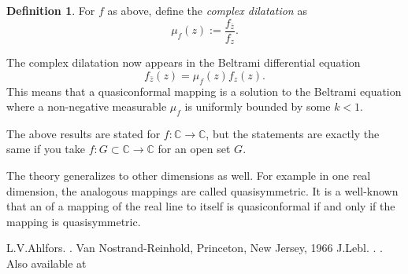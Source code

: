 \documentclass[12pt]{article}
\theoremstyle{theorem}
\theoremstyle{definition}
\newtheorem*{defn}{Definition}
\begin{document}
\begin{defn}
For $f$ as above, define the {\em complex dilatation} as
\begin{equation*}
\mu_f(z) := \frac{f_{\bar{z}}}{f_z} .
\end{equation*}
\end{defn}

The complex dilatation now appears in the Beltrami differential equation
\begin{equation*}
f_{\bar{z}}(z) = \mu_f(z)f_z(z) .
\end{equation*}
This means that a quasiconformal mapping is a solution to the Beltrami equation where a non-negative measurable $\mu_f$ is uniformly bounded by some $k < 1$.

The above results are stated for $f\colon {\mathbb{C}} \to {\mathbb{C}}$, but
the statements are exactly the same if you take $f\colon G \subset {\mathbb{C}} \to {\mathbb{C}}$ for an open set $G$.

The theory generalizes to other dimensions as well.  For example in one real dimension, the analogous mappings are called quasisymmetric.  It is a well-known  that an  of a mapping of the real line to itself is quasiconformal if and only if the mapping is quasisymmetric.

\begin{thebibliography}{9}
L.\@ V.\@ Ahlfors. \emph{}. Van Nostrand-Reinhold, Princeton, New Jersey, 1966
J.\@ Lebl. \emph{}. . Also available at
\end{thebibliography}
\end{document}

